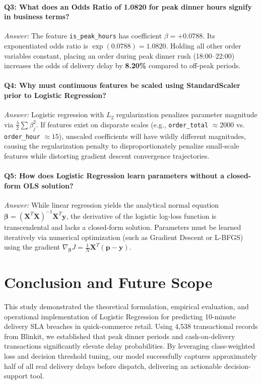 \documentclass[11pt,a4paper]{article}
\begin{document}
\paragraph{Q3: What does an Odds Ratio of 1.0820 for peak dinner hours signify in business terms?}
\textit{Answer:} The feature \texttt{is\_peak\_hours} has coefficient $\beta = +0.0788$. Its exponentiated odds ratio is $\exp(0.0788) = 1.0820$. Holding all other order variables constant, placing an order during peak dinner rush (18:00--22:00) increases the odds of delivery delay by \textbf{8.20\%} compared to off-peak periods.

\paragraph{Q4: Why must continuous features be scaled using StandardScaler prior to Logistic Regression?}
\textit{Answer:} Logistic regression with $L_2$ regularization penalizes parameter magnitude via $\frac{\lambda}{2} \sum \beta_j^2$. If features exist on disparate scales (e.g., \texttt{order\_total} $\approx 2000$ vs. \texttt{order\_hour} $\approx 15$), unscaled coefficients will have wildly different magnitudes, causing the regularization penalty to disproportionately penalize small-scale features while distorting gradient descent convergence trajectories.

\paragraph{Q5: How does Logistic Regression learn parameters without a closed-form OLS solution?}
\textit{Answer:} While linear regression yields the analytical normal equation $\boldsymbol{\beta} = (\mathbf{X}^T\mathbf{X})^{-1}\mathbf{X}^T\mathbf{y}$, the derivative of the logistic log-loss function is transcendental and lacks a closed-form solution. Parameters must be learned iteratively via numerical optimization (such as Gradient Descent or L-BFGS) using the gradient $\nabla_{\boldsymbol{\beta}} J = \frac{1}{N}\mathbf{X}^T(\mathbf{p} - \mathbf{y})$.

\section{Conclusion and Future Scope}
\label{sec:conclusion}
This study demonstrated the theoretical formulation, empirical evaluation, and operational implementation of Logistic Regression for predicting 10-minute delivery SLA breaches in quick-commerce retail. Using 4,538 transactional records from Blinkit, we established that peak dinner periods and cash-on-delivery transactions significantly elevate delay probabilities. By leveraging class-weighted loss and decision threshold tuning, our model successfully captures approximately half of all real delivery delays before dispatch, delivering an actionable decision-support tool.
\end{document}
